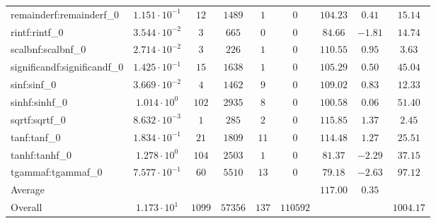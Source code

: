 \begin{tabular}{|l|c|c|c|c|c|c|c|c|}
remainderf:remainderf\_0     & $ 1.151 \cdot 10^{-1} $ & $ 12     $ & $ 1489  $ & $ 1   $ & $ 0      $ & $ 104.23      $ & $ 0.41    $ & $ 15.14   $ \\
rintf:rintf\_0               & $ 3.544 \cdot 10^{-2} $ & $ 3      $ & $ 665   $ & $ 0   $ & $ 0      $ & $ 84.66       $ & $ -1.81   $ & $ 14.74   $ \\
scalbnf:scalbnf\_0           & $ 2.714 \cdot 10^{-2} $ & $ 3      $ & $ 226   $ & $ 1   $ & $ 0      $ & $ 110.55      $ & $ 0.95    $ & $ 3.63    $ \\
significandf:significandf\_0 & $ 1.425 \cdot 10^{-1} $ & $ 15     $ & $ 1638  $ & $ 1   $ & $ 0      $ & $ 105.29      $ & $ 0.50    $ & $ 45.04   $ \\
sinf:sinf\_0                 & $ 3.669 \cdot 10^{-2} $ & $ 4      $ & $ 1462  $ & $ 9   $ & $ 0      $ & $ 109.02      $ & $ 0.83    $ & $ 12.33   $ \\
sinhf:sinhf\_0               & $ 1.014 \cdot 10^{0}  $ & $ 102    $ & $ 2935  $ & $ 8   $ & $ 0      $ & $ 100.58      $ & $ 0.06    $ & $ 51.40   $ \\
sqrtf:sqrtf\_0               & $ 8.632 \cdot 10^{-3} $ & $ 1      $ & $ 285   $ & $ 2   $ & $ 0      $ & $ 115.85      $ & $ 1.37    $ & $ 2.45    $ \\
tanf:tanf\_0                 & $ 1.834 \cdot 10^{-1} $ & $ 21     $ & $ 1809  $ & $ 11  $ & $ 0      $ & $ 114.48      $ & $ 1.27    $ & $ 25.51   $ \\
tanhf:tanhf\_0               & $ 1.278 \cdot 10^{0}  $ & $ 104    $ & $ 2503  $ & $ 1   $ & $ 0      $ & $ 81.37       $ & $ -2.29   $ & $ 37.15   $ \\
tgammaf:tgammaf\_0           & $ 7.577 \cdot 10^{-1} $ & $ 60     $ & $ 5510  $ & $ 13  $ & $ 0      $ & $ 79.18       $ & $ -2.63   $ & $ 97.12   $ \\
\hline
Average                      & $                     $ & $        $ & $       $ & $     $ & $        $ & $ 117.00      $ & $ 0.35    $ & $         $ \\
\hline
Overall                      & $ 1.173 \cdot 10^{1}  $ & $ 1099   $ & $ 57356 $ & $ 137 $ & $ 110592 $ & $             $ & $         $ & $ 1004.17 $ \\
\hline
\end{tabular}
